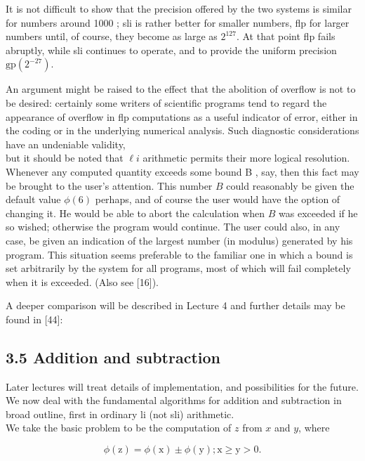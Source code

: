 \documentclass[10pt]{article}
\begin{document}
It is not difficult to show that the precision offered by the two systems is similar for numbers around 1000 ; sli is rather better for smaller numbers, flp for larger numbers until, of course, they become as large as $2^{127}$. At that point flp fails abruptly, while sli continues to operate, and to provide the uniform precision $\mathrm{gp}\left(2^{-27}\right)$.

An argument might be raised to the effect that the abolition of overflow is not to be desired: certainly some writers of scientific programs tend to regard the appearance of overflow in flp computations as a useful indicator of error, either in the coding or in the underlying numerical analysis. Such diagnostic considerations have an undeniable validity,\\
but it should be noted that $\ell i$ arithmetic permits their more logical resolution. Whenever any computed quantity exceeds some bound B , say, then this fact may be brought to the user's attention. This number $B$ could reasonably be given the default value $\phi(6)$ perhaps, and of course the user would have the option of changing it. He would be able to abort the calculation when $B$ was exceeded if he so wished; otherwise the program would continue. The user could also, in any case, be given an indication of the largest number (in modulus) generated by his program. This situation seems preferable to the familiar one in which a bound is set arbitrarily by the system for all programs, most of which will fail completely when it is exceeded. (Also see [16]).

A deeper comparison will be described in Lecture 4 and further details may be found in [44]:

\subsection*{3.5 Addition and subtraction}
Later lectures will treat details of implementation, and possibilities for the future. We now deal with the fundamental algorithms for addition and subtraction in broad outline, first in ordinary li (not sli) arithmetic.\\
We take the basic problem to be the computation of $z$ from $x$ and $y$, where


\begin{equation*}
\phi(\mathrm{z})=\phi(\mathrm{x}) \pm \phi(\mathrm{y}) ; \mathrm{x} \geqslant \mathrm{y}>0 . \tag{3.5.1}
\end{equation*}
\end{document}
